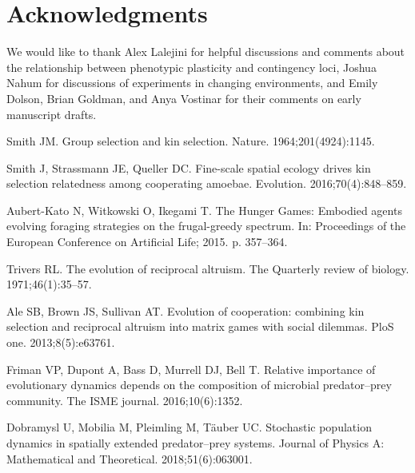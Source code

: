\documentclass[10pt,letterpaper,final]{article}
\begin{document}
\section*{Acknowledgments}
We would like to thank Alex Lalejini for helpful discussions and comments about the relationship between phenotypic plasticity and contingency loci, Joshua Nahum for discussions of experiments in changing environments, and Emily Dolson, Brian Goldman, and Anya Vostinar for their comments on early manuscript drafts.



\begin{thebibliography}{10}

Smith JM.
\newblock Group selection and kin selection.
\newblock Nature. 1964;201(4924):1145.

Smith J, Strassmann JE, Queller DC.
\newblock Fine-scale spatial ecology drives kin selection relatedness among
  cooperating amoebae.
\newblock Evolution. 2016;70(4):848--859.

Aubert-Kato N, Witkowski O, Ikegami T.
\newblock The {Hunger} {Games}: {Embodied} agents evolving foraging strategies
  on the frugal-greedy spectrum.
\newblock In: Proceedings of the {European} {Conference} on {Artificial}
  {Life}; 2015. p. 357--364.

Trivers RL.
\newblock The evolution of reciprocal altruism.
\newblock The Quarterly review of biology. 1971;46(1):35--57.

Ale SB, Brown JS, Sullivan AT.
\newblock Evolution of cooperation: combining kin selection and reciprocal
  altruism into matrix games with social dilemmas.
\newblock PloS one. 2013;8(5):e63761.

Friman VP, Dupont A, Bass D, Murrell DJ, Bell T.
\newblock Relative importance of evolutionary dynamics depends on the
  composition of microbial predator–prey community.
\newblock The ISME journal. 2016;10(6):1352.

Dobramysl U, Mobilia M, Pleimling M, Täuber UC.
\newblock Stochastic population dynamics in spatially extended predator–prey
  systems.
\newblock Journal of Physics A: Mathematical and Theoretical.
  2018;51(6):063001.


\end{thebibliography}
\end{document}
